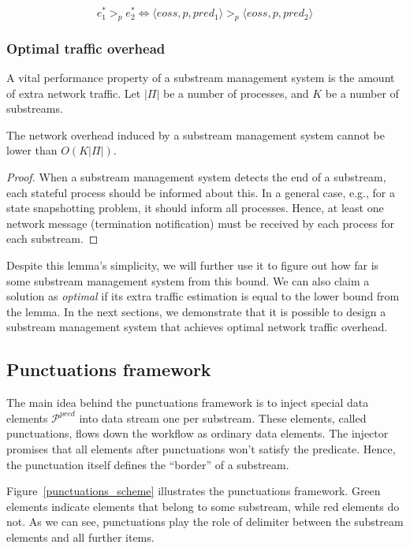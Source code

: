 \begin{equation}
e^{*}_1 >_p e^{*}_2 \Leftrightarrow \langle eoss, p, pred_1\rangle >_p \langle eoss, p, pred_2\rangle
\end{equation}

\subsubsection{Optimal traffic overhead}

A vital performance property of a substream management system is the amount of extra network traffic. Let $|\Pi|$ be a number of processes, and $K$ be a number of substreams. 

\begin{lemma}
The network overhead induced by a substream management system cannot be lower than $O(K|\Pi|)$. 
\end{lemma}
\begin{proof}
When a substream management system detects the end of a substream, each stateful process should be informed about this. In a general case, e.g., for a state snapshotting problem, it should inform all processes. Hence, at least one network message (termination notification) must be received by each process for each substream.
\end{proof}

Despite this lemma's simplicity, we will further use it to figure out how far is some substream management system from this bound. We can also claim a solution as {\em optimal} if its extra traffic estimation is equal to the lower bound from the lemma. In the next sections, we demonstrate that it is possible to design a substream management system that achieves optimal network traffic overhead.

\subsection{Punctuations framework}
\label{fs-acker-punctuations}

The main idea behind the punctuations framework is to inject special data elements $\mathcal{P}^{pred}$ into data stream one per substream. These elements, called punctuations, flows down the workflow as ordinary data elements. The injector promises that all elements after punctuations won't satisfy the predicate. Hence, the punctuation itself defines the ``border'' of a substream.

Figure~\ref{punctuations_scheme} illustrates the punctuations framework. Green elements indicate elements that belong to some substream, while red elements do not. As we can see, punctuations play the role of delimiter between the substream elements and all further items.

